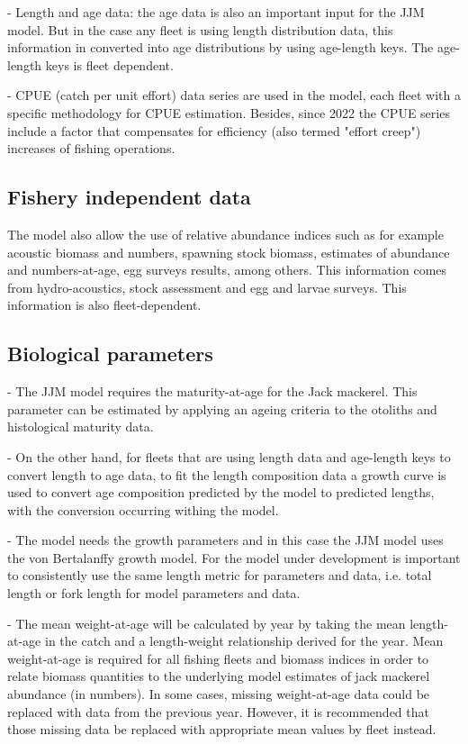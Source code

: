 \documentclass{article}
\begin{document}
- Length and age data: the age data is also an important input for the JJM model. But in the case any fleet is using length distribution data, this information in converted into age distributions by using age-length keys. The age-length keys is fleet dependent.

- CPUE (catch per unit effort) data series are used in the model, each fleet with a specific methodology for CPUE estimation. Besides, since 2022 the CPUE series include a factor that compensates for efficiency (also termed "effort creep") increases of fishing operations.

\subsection{Fishery independent data}

The model also allow the use of relative abundance indices such as for example acoustic biomass and numbers, spawning stock biomass, estimates of abundance and numbers-at-age, egg surveys results, among others. This information comes from hydro-acoustics, stock assessment and egg and larvae surveys. This information is also fleet-dependent.

\subsection{Biological parameters}

- The JJM model requires the maturity-at-age for the Jack mackerel. This parameter can be estimated by applying an ageing criteria to the otoliths and histological maturity data.

- On the other hand, for fleets that are using length data and age-length keys to convert length to age data, to fit the length composition data a growth curve is used to convert age composition predicted by the model to predicted lengths, with the conversion occurring withing the model.

- The model needs the growth parameters and in this case the JJM model uses the von Bertalanffy growth model. For the model under development is important to consistently use the same length metric for parameters and data, i.e. total length or fork length for model parameters and data.

- The mean weight-at-age will be calculated by year by taking the mean length-at-age in the catch and a length-weight relationship derived for the year. Mean weight-at-age is required for all fishing fleets and biomass indices in order to relate biomass quantities to the underlying model estimates of jack mackerel abundance (in numbers). In some cases, missing weight-at-age data could be replaced with data from the previous year. However, it is recommended that those missing data be replaced with appropriate mean values by fleet instead. 
\end{document}

